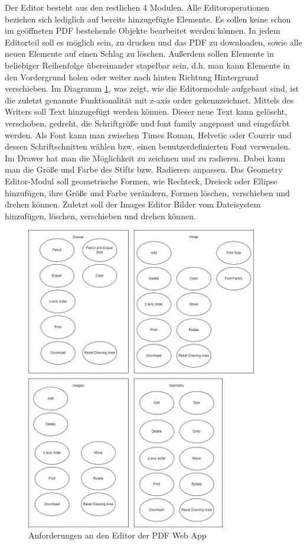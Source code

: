 Der Editor besteht aus den restlichen 4 Modulen. Alle Editoroperationen beziehen sich lediglich auf bereits hinzugefügte Elemente. Es sollen keine schon im geöffneten PDF bestehende Objekte bearbeitet werden können. In jedem Editorteil soll es möglich sein, zu drucken und das PDF zu downloaden, sowie alle neuen Elemente auf einen Schlag zu löschen. Außerdem sollen Elemente in beliebiger Reihenfolge übereinander stapelbar sein, d.h. man kann Elemente in den Vordergrund holen oder weiter nach hinten Richtung Hintergrund verschieben. Im Diagramm \ref{fig:editor}, was zeigt, wie die Editormodule aufgebaut sind, ist die zuletzt genannte Funktionalität mit z-axis order gekennzeichnet. Mittels des Writers soll Text hinzugefügt werden können. Dieser neue Text kann gelöscht, verschoben, gedreht, die Schriftgröße und font family angepasst und eingefärbt werden. Als Font kann man zwischen Times Roman, Helvetic oder Courrir und dessen Schriftschnitten wählen bzw. einen benutzerdefinierten Font verwenden. Im Drawer hat man die Möglichkeit zu zeichnen und zu radieren. Dabei kann man die Größe und Farbe des Stifts bzw. Radierers anpassen. Das Geometry Editor-Modul soll geometrische Formen, wie Rechteck, Dreieck oder Ellipse hinzufügen, ihre Größe und Farbe verändern, Formen löschen, verschieben und drehen können. Zuletzt soll der Images Editor Bilder vom Dateisystem hinzufügen, löschen, verschieben und drehen können.


\begin{figure}[!htbp]
	\centering
	\includegraphics[width=0.9\textwidth]{"images/editor-funktionen-anforderungen.png"}
	\caption{Anforderungen an den Editor der PDF Web App}
	\label{fig:editor}
\end{figure}


